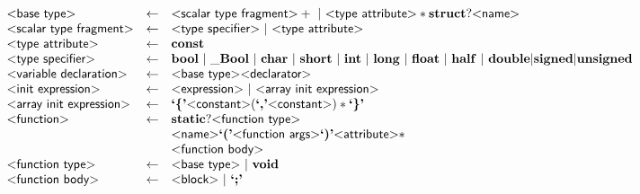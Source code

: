 \begin{figure}
\[\begin{array}{lcl}
  \text{\sf\textless base type\textgreater} & \gets & \text{\sf\textless scalar type fragment\textgreater}+
                               ~|~ \text{\sf\textless type attribute\textgreater}* \mathbf{struct}? \text{\sf\textless name\textgreater}\\


  \text{\sf\textless scalar type fragment\textgreater} & \gets & \text{\sf\textless type specifier\textgreater} ~|~ \text{\sf\textless type attribute\textgreater} \\

  \text{\sf\textless type attribute\textgreater} & \gets & \mathbf{const} \\

  \text{\sf\textless type specifier\textgreater} & \gets & \mathbf{bool}
                                    ~|~ \mathbf{\_Bool}
                                    ~|~ \mathbf{char}
                                    ~|~ \mathbf{short}
                                    ~|~ \mathbf{int}
                                    ~|~ \mathbf{long}
                                    ~|~ \mathbf{float}
                                    ~|~ \mathbf{half}
                                    ~|~ \mathbf{double}
                                    | \mathbf{signed}
                                    | \mathbf{unsigned}
  \\

  \text{\sf\textless variable declaration\textgreater} & \gets & \text{\sf\textless base type\textgreater} \text{\sf\textless declarator\textgreater}
  \\

  \text{\sf\textless init expression\textgreater} & \gets & \text{\sf\textless expression\textgreater} ~|~ \text{\sf\textless array init expression\textgreater} \\

  \text{\sf\textless array init expression\textgreater} & \gets & \text{\bf`\{'} \text{\sf\textless constant\textgreater}
                                                        (\text{\bf`,'} \text{\sf\textless constant\textgreater})*
                                             \text{\bf`\}'}
  \\
  \text{\sf\textless function\textgreater} & \gets & \mathbf{static}? \text{\sf\textless function type\textgreater} \\
                                & & \text{\sf\textless name\textgreater}
                                \text{\bf`('} \text{\sf\textless function args\textgreater} \text{\bf`)'} \text{\sf\textless attribute\textgreater}*\\
                                & & \text{\sf\textless function body\textgreater}
  \\
  \text{\sf\textless function type\textgreater} & \gets & \text{\sf\textless base type\textgreater} ~|~ \mathbf{void} \\

  \text{\sf\textless function body\textgreater} & \gets & \text{\sf\textless block\textgreater} ~|~ \text{\bf`;'}\\


\end{array}\]
\end{figure}

